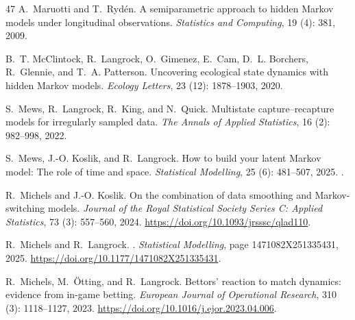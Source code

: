 \documentclass[namedate,webpdf,modern,medium]{oup-authoring-template}
\begin{document}
\begin{thebibliography}{47}
A.~Maruotti and T.~Ryd{\'e}n.
\newblock A semiparametric approach to hidden {M}arkov models under
  longitudinal observations.
\newblock \emph{Statistics and Computing}, 19 (4): 381, 2009.

B.~T. McClintock, R.~Langrock, O.~Gimenez, E.~Cam, D.~L. Borchers, R.~Glennie,
  and T.~A. Patterson.
\newblock Uncovering ecological state dynamics with hidden {M}arkov models.
\newblock \emph{{E}cology {L}etters}, 23 (12): 1878--1903,
  2020.

S.~Mews, R.~Langrock, R.~King, and N.~Quick.
\newblock Multistate capture--recapture models for irregularly sampled data.
\newblock \emph{The Annals of Applied Statistics}, 16 (2):
  982--998, 2022.

S.~Mews, J.-O. Koslik, and R.~Langrock.
\newblock How to build your latent {M}arkov model: {T}he role of time and
  space.
\newblock \emph{Statistical {M}odelling}, 25 (6): 481--507,
  2025.
\newblock {}.

R.~Michels and J.-O. Koslik.
\newblock On the combination of data smoothing and {M}arkov-switching models.
\newblock \emph{Journal of the Royal Statistical Society Series C: Applied
  Statistics}, 73 (3): 557--560, 2024.
\newblock \url{https://doi.org/10.1093/jrsssc/qlad110}.

R.~Michels and R.~Langrock.
.
\newblock \emph{Statistical Modelling}, page 1471082X251335431, 2025.
\newblock \url{https://doi.org/10.1177/1471082X251335431}.

R.~Michels, M.~{\"O}tting, and R.~Langrock.
\newblock Bettors' reaction to match dynamics: evidence from in-game betting.
\newblock \emph{European Journal of Operational Research}, 310
  (3): 1118--1127, 2023.
\newblock \url{https://doi.org/10.1016/j.ejor.2023.04.006}.


\end{thebibliography}
\end{document}
